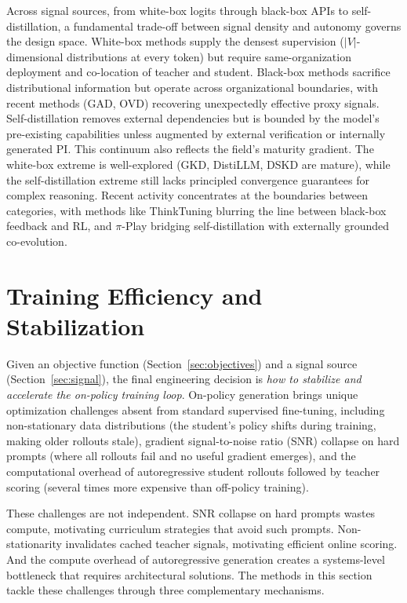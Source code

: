 \documentclass{article} %
\begin{document}
Across signal sources, from white-box logits through black-box APIs to self-distillation, a fundamental trade-off between signal density and autonomy governs the design space. White-box methods supply the densest supervision ($|V|$-dimensional distributions at every token) but require same-organization deployment and co-location of teacher and student. Black-box methods sacrifice distributional information but operate across organizational boundaries, with recent methods (GAD, OVD) recovering unexpectedly effective proxy signals. Self-distillation removes external dependencies but is bounded by the model's pre-existing capabilities unless augmented by external verification or internally generated PI. This continuum also reflects the field's maturity gradient. The white-box extreme is well-explored (GKD, DistiLLM, DSKD are mature), while the self-distillation extreme still lacks principled convergence guarantees for complex reasoning. Recent activity concentrates at the boundaries between categories, with methods like ThinkTuning blurring the line between black-box feedback and RL, and $\pi$-Play bridging self-distillation with externally grounded co-evolution.

\section{Training Efficiency and Stabilization}
\label{sec:dynamics}

Given an objective function (Section~\ref{sec:objectives}) and a signal source (Section~\ref{sec:signal}), the final engineering decision is \emph{how to stabilize and accelerate the on-policy training loop}. On-policy generation brings unique optimization challenges absent from standard supervised fine-tuning, including non-stationary data distributions (the student's policy shifts during training, making older rollouts stale), gradient signal-to-noise ratio (SNR) collapse on hard prompts (where all rollouts fail and no useful gradient emerges), and the computational overhead of autoregressive student rollouts followed by teacher scoring (several times more expensive than off-policy training).

These challenges are not independent. SNR collapse on hard prompts wastes compute, motivating curriculum strategies that avoid such prompts. Non-stationarity invalidates cached teacher signals, motivating efficient online scoring. And the compute overhead of autoregressive generation creates a systems-level bottleneck that requires architectural solutions. The methods in this section tackle these challenges through three complementary mechanisms.
\end{document}
